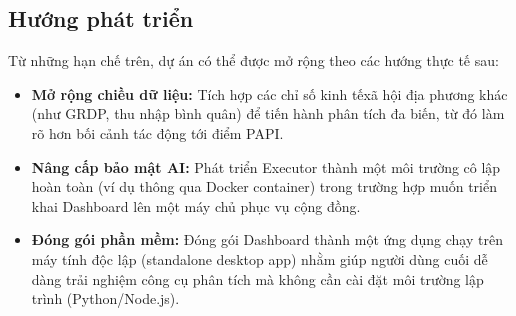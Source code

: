 \subsection{Hướng phát triển}
Từ những hạn chế trên, dự án có thể được mở rộng theo các hướng thực tế sau:
\begin{itemize}
    \item \textbf{Mở rộng chiều dữ liệu:} Tích hợp các chỉ số kinh tế\textendash xã hội địa phương khác (như GRDP, thu nhập bình quân) để tiến hành phân tích đa biến, từ đó làm rõ hơn bối cảnh tác động tới điểm PAPI.
    \item \textbf{Nâng cấp bảo mật AI:} Phát triển Executor thành một môi trường cô lập hoàn toàn (ví dụ thông qua Docker container) trong trường hợp muốn triển khai Dashboard lên một máy chủ phục vụ cộng đồng.
    \item \textbf{Đóng gói phần mềm:} Đóng gói Dashboard thành một ứng dụng chạy trên máy tính độc lập (standalone desktop app) nhằm giúp người dùng cuối dễ dàng trải nghiệm công cụ phân tích mà không cần cài đặt môi trường lập trình (Python/Node.js).
\end{itemize}
